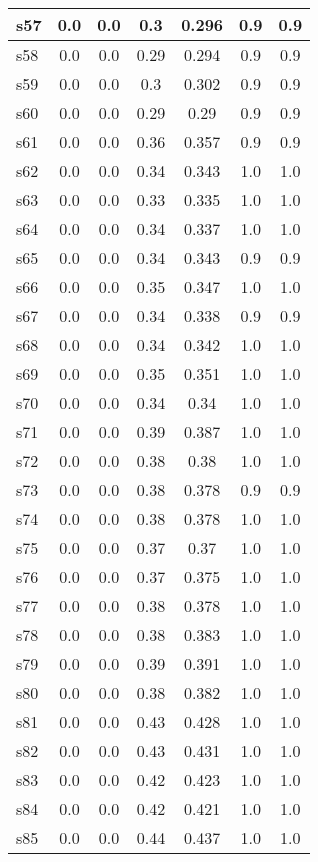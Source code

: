 \documentclass{article}
\begin{document}
\begin{tabular}{|l|c|c|c|c|c|c|}
\hline
s57 &0.0 & 0.0 & 0.3 & 0.296 & 0.9 & 0.9\\
\hline
s58 &0.0 & 0.0 & 0.29 & 0.294 & 0.9 & 0.9\\
\hline
s59 &0.0 & 0.0 & 0.3 & 0.302 & 0.9 & 0.9\\
\hline
s60 &0.0 & 0.0 & 0.29 & 0.29 & 0.9 & 0.9\\
\hline
s61 &0.0 & 0.0 & 0.36 & 0.357 & 0.9 & 0.9\\
\hline
s62 &0.0 & 0.0 & 0.34 & 0.343 & 1.0 & 1.0\\
\hline
s63 &0.0 & 0.0 & 0.33 & 0.335 & 1.0 & 1.0\\
\hline
s64 &0.0 & 0.0 & 0.34 & 0.337 & 1.0 & 1.0\\
\hline
s65 &0.0 & 0.0 & 0.34 & 0.343 & 0.9 & 0.9\\
\hline
s66 &0.0 & 0.0 & 0.35 & 0.347 & 1.0 & 1.0\\
\hline
s67 &0.0 & 0.0 & 0.34 & 0.338 & 0.9 & 0.9\\
\hline
s68 &0.0 & 0.0 & 0.34 & 0.342 & 1.0 & 1.0\\
\hline
s69 &0.0 & 0.0 & 0.35 & 0.351 & 1.0 & 1.0\\
\hline
s70 &0.0 & 0.0 & 0.34 & 0.34 & 1.0 & 1.0\\
\hline
s71 &0.0 & 0.0 & 0.39 & 0.387 & 1.0 & 1.0\\
\hline
s72 &0.0 & 0.0 & 0.38 & 0.38 & 1.0 & 1.0\\
\hline
s73 &0.0 & 0.0 & 0.38 & 0.378 & 0.9 & 0.9\\
\hline
s74 &0.0 & 0.0 & 0.38 & 0.378 & 1.0 & 1.0\\
\hline
s75 &0.0 & 0.0 & 0.37 & 0.37 & 1.0 & 1.0\\
\hline
s76 &0.0 & 0.0 & 0.37 & 0.375 & 1.0 & 1.0\\
\hline
s77 &0.0 & 0.0 & 0.38 & 0.378 & 1.0 & 1.0\\
\hline
s78 &0.0 & 0.0 & 0.38 & 0.383 & 1.0 & 1.0\\
\hline
s79 &0.0 & 0.0 & 0.39 & 0.391 & 1.0 & 1.0\\
\hline
s80 &0.0 & 0.0 & 0.38 & 0.382 & 1.0 & 1.0\\
\hline
s81 &0.0 & 0.0 & 0.43 & 0.428 & 1.0 & 1.0\\
\hline
s82 &0.0 & 0.0 & 0.43 & 0.431 & 1.0 & 1.0\\
\hline
s83 &0.0 & 0.0 & 0.42 & 0.423 & 1.0 & 1.0\\
\hline
s84 &0.0 & 0.0 & 0.42 & 0.421 & 1.0 & 1.0\\
\hline
s85 &0.0 & 0.0 & 0.44 & 0.437 & 1.0 & 1.0\\

\end{tabular}
\end{document}
